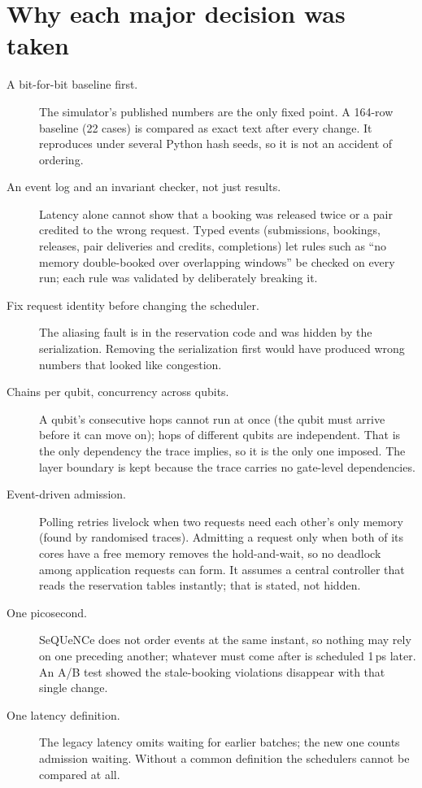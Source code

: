 \section{Why each major decision was taken}
\begin{description}
  \item[A bit-for-bit baseline first.] The simulator's published numbers are the only fixed point. A 164-row baseline (22 cases) is compared as exact text after every change. It reproduces under several Python hash seeds, so it is not an accident of ordering.
  \item[An event log and an invariant checker, not just results.] Latency alone cannot show that a booking was released twice or a pair credited to the wrong request. Typed events (submissions, bookings, releases, pair deliveries and credits, completions) let rules such as ``no memory double-booked over overlapping windows'' be checked on every run; each rule was validated by deliberately breaking it.
  \item[Fix request identity before changing the scheduler.] The aliasing fault is in the reservation code and was hidden by the serialization. Removing the serialization first would have produced wrong numbers that looked like congestion.
  \item[Chains per qubit, concurrency across qubits.] A qubit's consecutive hops cannot run at once (the qubit must arrive before it can move on); hops of different qubits are independent. That is the only dependency the trace implies, so it is the only one imposed. The layer boundary is kept because the trace carries no gate-level dependencies.
  \item[Event-driven admission.] Polling retries livelock when two requests need each other's only memory (found by randomised traces). Admitting a request only when both of its cores have a free memory removes the hold-and-wait, so no deadlock among application requests can form. It assumes a central controller that reads the reservation tables instantly; that is stated, not hidden.
  \item[One picosecond.] SeQUeNCe does not order events at the same instant, so nothing may rely on one preceding another; whatever must come after is scheduled 1\,ps later. An A/B test showed the stale-booking violations disappear with that single change.
  \item[One latency definition.] The legacy latency omits waiting for earlier batches; the new one counts admission waiting. Without a common definition the schedulers cannot be compared at all.

\end{description}
